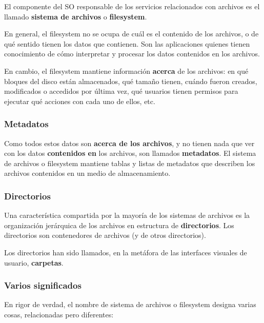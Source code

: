 \documentclass[spanish,a4paper,]{article}
\begin{document}
El componente del SO responsable de los servicios relacionados con
archivos es el llamado \textbf{sistema de archivos} o
\textbf{filesystem}.

En general, el filesystem no se ocupa de cuál es el contenido de los
archivos, o de qué sentido tienen los datos que contienen. Son las
aplicaciones quienes tienen conocimiento de cómo interpretar y procesar
los datos contenidos en los archivos.

En cambio, el filesystem mantiene información \textbf{acerca} de los
archivos: en qué bloques del disco están almacenados, qué tamaño tienen,
cuándo fueron creados, modificados o accedidos por última vez, qué
usuarios tienen permisos para ejecutar qué acciones con cada uno de
ellos, etc.

\hypertarget{metadatos}{%
\subsubsection{Metadatos}\label{metadatos}}

Como todos estos datos son \textbf{acerca de los archivos}, y no tienen
nada que ver con los datos \textbf{contenidos en} los archivos, son
llamados \textbf{metadatos}. El sistema de archivos o filesystem
mantiene tablas y listas de metadatos que describen los archivos
contenidos en un medio de almacenamiento.

\hypertarget{directorios}{%
\subsubsection{Directorios}\label{directorios}}

Una característica compartida por la mayoría de los sistemas de archivos
es la organización jerárquica de los archivos en estructura de
\textbf{directorios}. Los directorios son contenedores de archivos (y de
otros directorios).

Los directorios han sido llamados, en la metáfora de las interfaces
visuales de usuario, \textbf{carpetas}.

\hypertarget{varios-significados}{%
\subsubsection{Varios significados}\label{varios-significados}}

En rigor de verdad, el nombre de sistema de archivos o filesystem
designa varias cosas, relacionadas pero diferentes:
\end{document}
